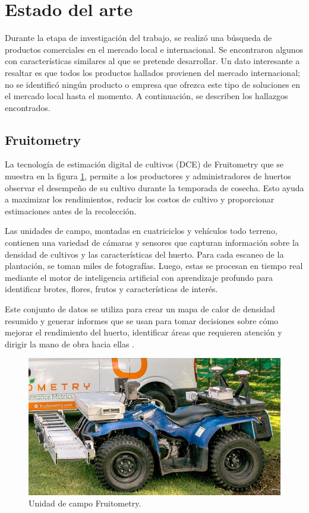 
\section{Estado del arte}

Durante la etapa de investigación del trabajo, se realizó una búsqueda de productos comerciales en el mercado local e internacional. Se encontraron algunos con características similares al que se pretende desarrollar. Un dato interesante a resaltar es que todos los productos hallados provienen del mercado internacional; no se identificó ningún producto o empresa que ofrezca este tipo de soluciones en el mercado local hasta el momento. A continuación, se describen los hallazgos encontrados.

\subsection{Fruitometry}

La tecnología de estimación digital de cultivos (DCE) de Fruitometry que se muestra en la figura \ref{fig:Fruitometry}, permite a los productores y administradores de huertos observar el desempeño de su cultivo durante la temporada de cosecha. Esto ayuda a maximizar los rendimientos, reducir los costos de cultivo y proporcionar estimaciones antes de la recolección.

Las unidades de campo, montadas en cuatriciclos y vehículos todo terreno, contienen una variedad de cámaras y sensores que capturan información sobre la densidad de cultivos y las características del huerto. Para cada escaneo de la plantación, se toman miles de fotografías. Luego, estas se procesan en tiempo real mediante el motor de inteligencia artificial con aprendizaje profundo para identificar brotes, flores, frutos y características de interés.

Este conjunto de datos se utiliza para crear un mapa de calor de densidad resumido y generar informes que se usan para tomar decisiones sobre cómo mejorar el rendimiento del huerto, identificar áreas que requieren atención y dirigir la mano de obra hacia ellas \citep{WEBSITE:Fruitometry2024}.

\vspace{1cm}
\begin{figure}[htbp]
	\centering
	\includegraphics[width=.5\textwidth]{./Figures/Fruitometry.png}
	\caption{Unidad de campo Fruitometry\protect\footnotemark.}
	\label{fig:Fruitometry}
\end{figure}
\vspace{1cm}

